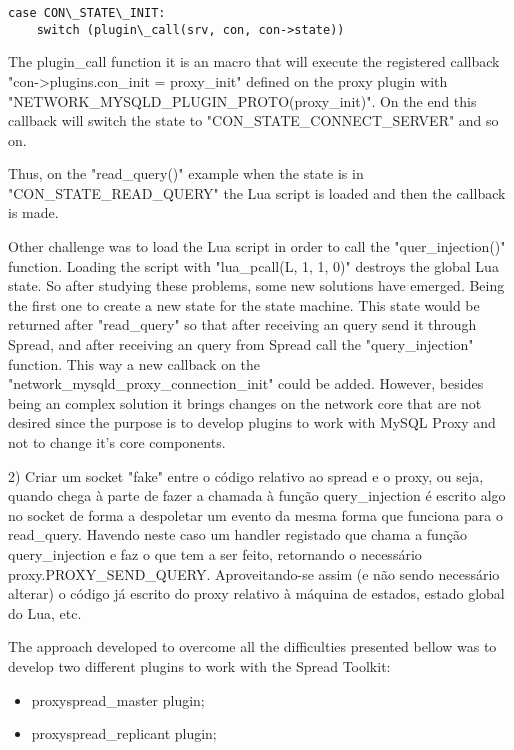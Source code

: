 \begin{lstlisting}
case CON\_STATE\_INIT:
	switch (plugin\_call(srv, con, con->state))
\end{lstlisting}


The plugin\_call function it is an macro that will execute the registered callback "con->plugins.con\_init = proxy\_init" defined on the proxy plugin with "NETWORK\_MYSQLD\_PLUGIN\_PROTO(proxy\_init)". On the end this callback will switch the state to "CON\_STATE\_CONNECT\_SERVER" and so on.

Thus, on the "read\_query()" example when the state is in "CON\_STATE\_READ\_QUERY" the Lua script is loaded and then the callback is made.


Other challenge was to load the Lua script in order to call the "quer\_injection()" function. Loading the script with "lua\_pcall(L, 1, 1, 0)" destroys the global Lua state. So after studying these problems, some new solutions have emerged. Being the first one to create a new state for the state machine. This state would be returned after "read\_query" so that after receiving an query send it through Spread, and after receiving an query from Spread call the "query\_injection" function. This way a new callback on the "network\_mysqld\_proxy\_connection\_init" could be added.
However, besides being an complex solution it brings changes on the network core that are not desired since the purpose is to develop plugins to work with MySQL Proxy and not to change it's core components.



	2) Criar um socket "fake" entre o código relativo ao spread e o proxy, ou seja, quando chega à parte de fazer a chamada à função query\_injection é 
	escrito algo no socket de forma a despoletar um evento da mesma forma que funciona para o read\_query. Havendo neste caso um handler registado que chama 
	a função query\_injection e faz o que tem a ser feito, retornando o necessário proxy.PROXY\_SEND\_QUERY. Aproveitando-se assim (e não sendo necessário 
	alterar) o código já escrito do proxy relativo à máquina de estados, estado global do Lua, etc.


The approach developed to overcome all the difficulties presented bellow was to develop two different plugins to work with the Spread Toolkit:

\begin{itemize}
	\item proxyspread\_master plugin;
	\item proxyspread\_replicant plugin;
\end{itemize}

